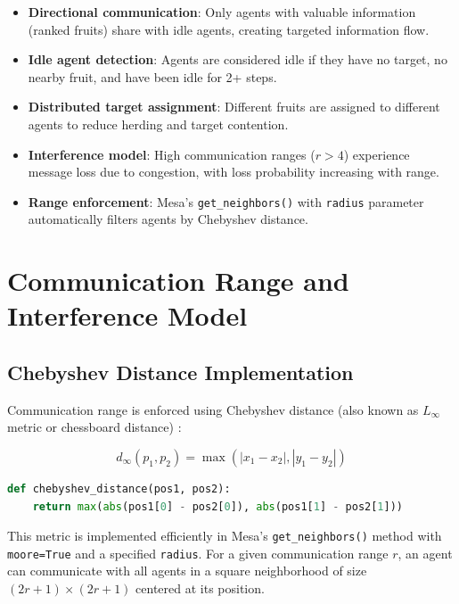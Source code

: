 \begin{itemize}
    \item \textbf{Directional communication}: Only agents with valuable information (ranked fruits) share with idle agents, creating targeted information flow.

    \item \textbf{Idle agent detection}: Agents are considered idle if they have no target, no nearby fruit, and have been idle for 2+ steps.

    \item \textbf{Distributed target assignment}: Different fruits are assigned to different agents to reduce herding and target contention.

    \item \textbf{Interference model}: High communication ranges ($r > 4$) experience message loss due to congestion, with loss probability increasing with range.

    \item \textbf{Range enforcement}: Mesa's \texttt{get\_neighbors()} with \texttt{radius} parameter automatically filters agents by Chebyshev distance.
\end{itemize}

\section{Communication Range and Interference Model}

\subsection{Chebyshev Distance Implementation}

Communication range is enforced using Chebyshev distance (also known as $L_\infty$ metric or chessboard distance) \citep{deza2009encyclopedia}:

\begin{equation}
d_{\infty}(p_1, p_2) = \max(|x_1 - x_2|, |y_1 - y_2|)
\end{equation}

\begin{lstlisting}[language=Python, caption=Chebyshev distance calculation]
def chebyshev_distance(pos1, pos2):
    return max(abs(pos1[0] - pos2[0]), abs(pos1[1] - pos2[1]))
\end{lstlisting}

This metric is implemented efficiently in Mesa's \texttt{get\_neighbors()} method with \texttt{moore=True} and a specified \texttt{radius}. For a given communication range $r$, an agent can communicate with all agents in a square neighborhood of size $(2r+1) \times (2r+1)$ centered at its position.

